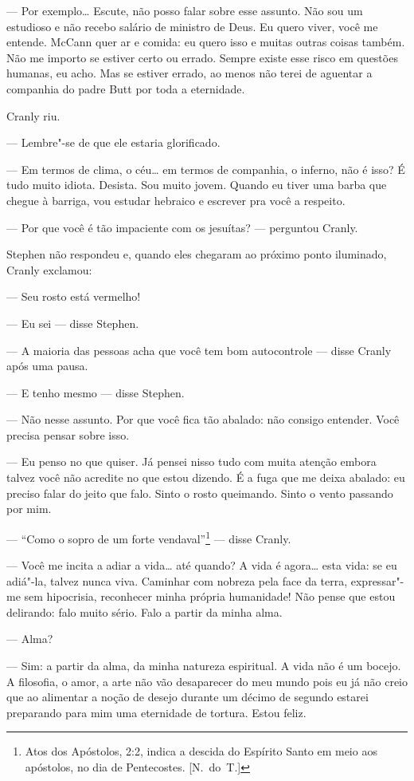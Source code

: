 --- Por exemplo\ldots{}  Escute, não posso falar sobre esse assunto.  Não sou um
estudioso e não recebo salário de ministro de Deus.  Eu quero viver, você me
entende.  McCann quer ar e comida: eu quero isso e muitas outras coisas também.
Não me importo se estiver certo ou errado.  Sempre existe esse risco em
questões humanas, eu acho.  Mas se estiver errado, ao menos não terei de
aguentar a companhia do padre Butt por toda a eternidade.

Cranly riu.

--- Lembre"-se de que ele estaria glorificado.

--- Em termos de clima, o céu\ldots{} em termos de companhia, o inferno, não é isso?
É tudo muito idiota.  Desista.  Sou muito jovem.  Quando eu tiver uma barba que
chegue à barriga, vou estudar hebraico e escrever pra você a respeito.

--- Por que você é tão impaciente com os jesuítas? --- perguntou Cranly.

Stephen não respondeu e, quando eles chegaram ao próximo ponto iluminado,
Cranly exclamou:

--- Seu rosto está vermelho!

--- Eu sei --- disse Stephen.

--- A maioria das pessoas acha que você tem bom autocontrole --- disse Cranly
após uma pausa.

--- E tenho mesmo --- disse Stephen.

--- Não nesse assunto.  Por que você fica tão abalado: não consigo entender.
Você precisa pensar sobre isso.

--- Eu penso no que quiser.  Já pensei nisso tudo com muita atenção embora
talvez você não acredite no que estou dizendo.  É a fuga que me deixa abalado:
eu preciso falar do jeito que falo.  Sinto o rosto queimando.  Sinto o vento
passando por mim.

--- “Como o sopro de um forte vendaval”\footnote{ Atos dos Apóstolos, 2:2,
indica a descida do Espírito Santo em meio aos apóstolos, no dia de
Pentecostes. [N.~do~T.]} --- disse Cranly.

--- Você me incita a adiar a vida\ldots{} até quando?  A vida é agora\ldots{} esta vida:
se eu adiá"-la, talvez nunca viva.  Caminhar com nobreza pela face da terra,
expressar"-me sem hipocrisia, reconhecer minha própria humanidade!  Não pense
que estou delirando: falo muito sério.  Falo a partir da minha alma.

--- Alma?

--- Sim: a partir da alma, da minha natureza espiritual.  A vida não é um
bocejo. A filosofia, o amor, a arte não vão desaparecer do meu mundo pois eu já
não creio que ao alimentar a noção de desejo durante um décimo de segundo
estarei preparando para mim uma eternidade de tortura.  Estou feliz.

